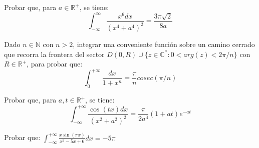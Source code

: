 \begin{ejer}
	Probar que, para $a\in\mathbb{R}^+$, se tiene:
	$$ \int_{-\infty}^{\infty} \frac{x^6dx}{(x^4+a^4)^2} = \frac{3\pi\sqrt{2}}{8a} $$
\end{ejer}


\begin{ejer}
	Dado $n\in\mathbb{N}$ con $n>2$, integrar una conveniente función sobre un camino cerrado que recorra la frontera del sector $D(0,R) \cup \{ z\in\mathbb{C}^{\ast} : 0<arg(z)<2\pi/n \}$ con $R\in\mathbb{R}^+$, para probar que:
	$$ \int_{0}^{+\infty} \frac{dx}{1+x^n} = \frac{\pi}{n} cosec(\pi/n) $$
\end{ejer}

\begin{ejer}
	Probar que, para $a,t\in\mathbb{R}^+$, se tiene:
	$$ \int_{-\infty}^{+\infty} \frac{\cos(tx)dx}{(x^2+a^2)^2} = \frac{\pi}{2a^3}(1+at)e^{-at} $$
\end{ejer}

\begin{ejer}
	Probar que: $\int_{-\infty}^{+\infty} \frac{x\sin(\pi x)}{x^2-5x+6} dx = -5\pi $ 
\end{ejer}


